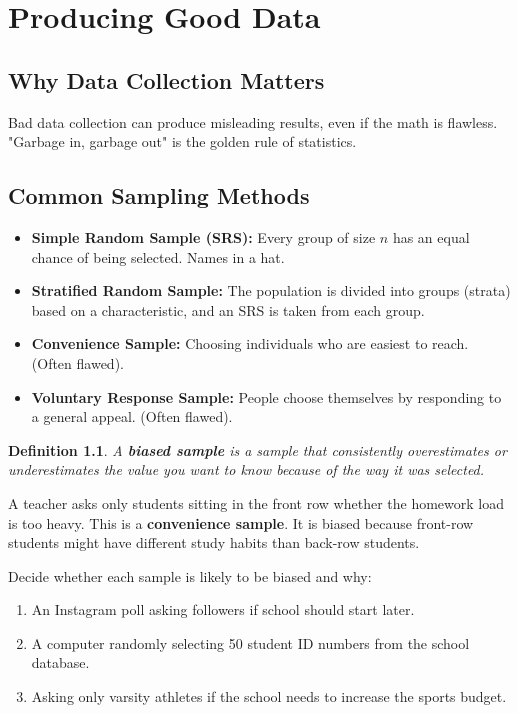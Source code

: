 \documentclass[11pt,openany]{book}
\newtheorem*{definition*}{Definition}
\begin{document}
\chapter{Producing Good Data}

\section{Why Data Collection Matters}
Bad data collection can produce misleading results, even if the math is flawless. "Garbage in, garbage out" is the golden rule of statistics.

\section{Common Sampling Methods}
\begin{itemize}
    \item \textbf{Simple Random Sample (SRS):} Every group of size $n$ has an equal chance of being selected. Names in a hat.
    \item \textbf{Stratified Random Sample:} The population is divided into groups (strata) based on a characteristic, and an SRS is taken from each group.
    \item \textbf{Convenience Sample:} Choosing individuals who are easiest to reach. (Often flawed).
    \item \textbf{Voluntary Response Sample:} People choose themselves by responding to a general appeal. (Often flawed).
\end{itemize}

\begin{definition*}
A \textbf{biased sample} is a sample that consistently overestimates or underestimates the value you want to know because of the way it was selected.
\end{definition*}

\begin{examplebox}
A teacher asks only students sitting in the front row whether the homework load is too heavy. This is a \textbf{convenience sample}. It is biased because front-row students might have different study habits than back-row students.
\end{examplebox}

\begin{byhand}
Decide whether each sample is likely to be biased and why:
\begin{enumerate}
    \item An Instagram poll asking followers if school should start later.
    \item A computer randomly selecting 50 student ID numbers from the school database.
    \item Asking only varsity athletes if the school needs to increase the sports budget.
\end{enumerate}
\end{byhand}
\end{document}
